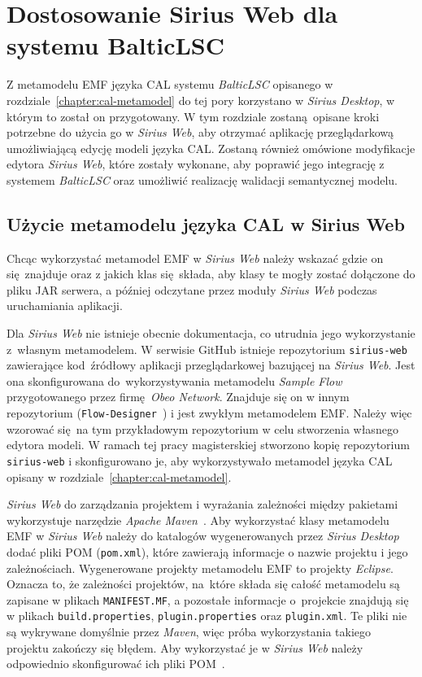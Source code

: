 \chapter{Dostosowanie Sirius Web dla systemu BalticLSC}

Z metamodelu EMF języka \gls{CAL} systemu \emph{BalticLSC}
opisanego w rozdziale~\ref{chapter:cal-metamodel} do tej pory korzystano w
\emph{Sirius Desktop}, w którym to został on przygotowany. W tym rozdziale
zostaną opisane kroki potrzebne do użycia go w \emph{Sirius Web}, aby otrzymać
aplikację przeglądarkową umożliwiającą edycję modeli języka \gls{CAL}.
Zostaną również omówione modyfikacje edytora \emph{Sirius Web}, które
zostały wykonane, aby poprawić jego integrację z systemem \emph{BalticLSC} oraz
umożliwić realizację walidacji semantycznej modelu.

\section{Użycie metamodelu języka CAL w Sirius Web}

Chcąc wykorzystać metamodel \gls{EMF} w \emph{Sirius Web} należy wskazać gdzie
on się znajduje oraz z jakich klas się składa, aby klasy te mogły zostać
dołączone do pliku \gls{JAR} serwera, a później odczytane przez moduły
\emph{Sirius
	Web} podczas uruchamiania aplikacji.

Dla \emph{Sirius Web} nie istnieje obecnie dokumentacja, co utrudnia jego
wykorzystanie z~własnym metamodelem. W serwisie GitHub istnieje repozytorium
\texttt{sirius-web}~\cite{sirius-web-github} zawierające kod~źródłowy aplikacji
przeglądarkowej
bazującej na \emph{Sirius Web}. Jest ona skonfigurowana do~wykorzystywania
metamodelu \emph{Sample Flow}~\cite{flow-network-github}
przygotowanego przez firmę \emph{Obeo Network}. Znajduje się on w innym
repozytorium (\texttt{Flow-Designer}~\cite{flow-network-github}) i jest
zwykłym metamodelem \gls{EMF}.
Należy więc wzorować się na tym przykładowym repozytorium w celu stworzenia
własnego edytora modeli.
W ramach tej pracy magisterskiej stworzono kopię repozytorium
\texttt{sirius-web} i skonfigurowano je, aby wykorzystywało metamodel
języka \gls{CAL} opisany w rozdziale~\ref{chapter:cal-metamodel}.

\emph{Sirius Web} do zarządzania projektem i wyrażania zależności między
pakietami wykorzystuje narzędzie \emph{Apache Maven}~\cite{maven-homepage}.
Aby wykorzystać klasy metamodelu \gls{EMF} w \emph{Sirius Web}
należy do katalogów wygenerowanych przez \emph{Sirius Desktop} dodać pliki
\gls{POM} (\texttt{pom.xml}), które zawierają informacje o nazwie projektu i
jego
zależnościach. Wygenerowane projekty metamodelu \gls{EMF} to projekty
\emph{Eclipse}.
Oznacza to, że zależności projektów,
na~które składa się całość metamodelu są zapisane w plikach
\texttt{MANIFEST.MF}, a pozostałe informacje o~projekcie znajdują się w
plikach \texttt{build.properties}, \texttt{plugin.properties} oraz
\texttt{plugin.xml}. Te pliki nie są wykrywane domyślnie przez \emph{Maven},
więc
próba wykorzystania takiego projektu zakończy się błędem. Aby wykorzystać je w
\emph{Sirius Web} należy odpowiednio skonfigurować ich pliki
\gls{POM}~\cite{maven-tycho-tutorial}.

